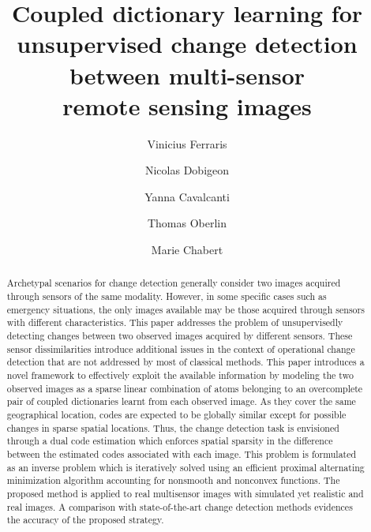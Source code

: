 \documentclass[review]{elsarticle}
\begin{document}
\begin{frontmatter}

\title{Coupled dictionary learning for unsupervised change detection between multi-sensor \\remote sensing images}

\author[n7]{Vinicius {Ferraris}}
\author[n7]{Nicolas {Dobigeon}}
\author[n7]{Yanna {Cavalcanti}}
\author[n7]{Thomas {Oberlin}}
\author[n7]{Marie {Chabert}}
\address[n7]{University of Toulouse, IRIT/INP-ENSEEEIHT, 2 Rue Camichel, 31071 Toulouse, France}




\begin{abstract}
Archetypal scenarios for change detection generally consider two images acquired through sensors of the same modality. However, in some specific cases such as emergency situations, the only images available may be those acquired through sensors with different characteristics. This paper addresses the problem of unsupervisedly detecting changes between two observed images acquired by different sensors. These sensor dissimilarities introduce additional issues in the context of operational change detection that are not addressed by most of classical methods. This paper introduces a novel framework to effectively exploit the available information by modeling the two observed images as a sparse linear combination of atoms belonging to an overcomplete pair of coupled dictionaries learnt from each observed image. As they cover the same geographical location, codes are expected to be globally similar except for possible changes in sparse spatial locations. Thus, the change detection task is envisioned through a dual code estimation which enforces spatial sparsity in the difference between the estimated codes associated with each image. This problem is formulated as an inverse problem which is iteratively solved using an efficient proximal alternating minimization algorithm accounting for nonsmooth and nonconvex functions. The proposed method is applied to real multisensor images with simulated yet realistic and real images. A comparison with state-of-the-art change detection methods evidences the accuracy of the proposed strategy.
\end{abstract}


\end{frontmatter}
\end{document}
